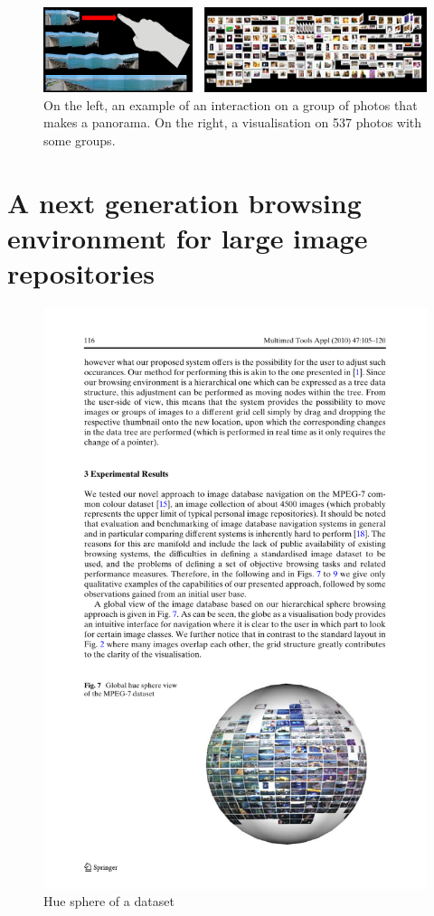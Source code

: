 \begin{figure}[ht]
	\centering
		\includegraphics[width=\textwidth]{imgs/hsu.png}
	\caption{On the left, an example of an interaction on a group of photos that makes a panorama. On the right, a visualisation on 537 photos with some groups.}
	\label{fig:hsu1}
\end{figure}


\newpage
\section{A next generation browsing environment for large image repositories} %
\label{sub:Schaefer}

\begin{figure}[ht]
	\centering
		\includegraphics[scale=1]{imgs/shaefer1.pdf}
	\caption{Hue sphere of a dataset}
	\label{fig:schaefer1}
\end{figure}

